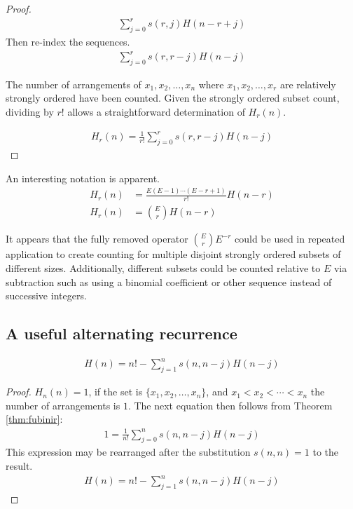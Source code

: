 \documentclass[12pt,reqno]{article}
\begin{document}
\begin{theorem}
\begin{proof}
		\begin{align}
			\sum_{j = 0}^{r} s(r,j) H(n - r + j)
		\end{align}
		Then re-index the sequences.
		\begin{align}
			\sum_{j = 0}^{r} s(r,r - j) H(n - j)
		\end{align}

		The number of arrangements of $x_{1}, x_{2}, \ldots, x_{n}$ where $x_{1}, x_{2}, \ldots, x_{r}$ are relatively strongly ordered have been counted. Given the strongly ordered subset count, dividing by $r!$ allows a straightforward determination of $H_{r}(n)$.

		\begin{align}
			H_{r} (n) = \frac{1}{r!}\sum_{j = 0}^{r} s(r,r - j) H(n - j) \nonumber
		\end{align}

	\end{proof}

\end{theorem}

An interesting notation is apparent.
\begin{align}
	H_{r} (n)  &= \frac{E (E - 1) \cdots (E - r + 1)}{r!} H(n - r) \\
	H_{r} (n)  &= \binom{E}{r} H(n - r) \label{eqn:binomform}
\end{align}

It appears that the fully removed operator $\binom{E}{r} E^{-r}$ could be used in repeated application to create counting for multiple disjoint strongly ordered subsets of different sizes. Additionally, different subsets could be counted relative to $E$ via subtraction such as using a binomial coefficient or other sequence instead of successive integers.

\subsection{A useful alternating recurrence}
\begin{corollary}

	\begin{align}
		H(n) = n!  - \sum_{j = 1}^{n} s(n,n - j) H(n - j)
	\end{align}
	\begin{proof}
		$H_{n}(n) = 1$, if the set is $\{x_{1}, x_{2},\ldots, x_{n}\}$, and $x_{1} < x_{2} < \cdots < x_{n}$ the number of arrangements is $1$. The next equation then follows from Theorem \ref{thm:fubinir}:
		\begin{align}
			1  = \frac{1}{n!}\sum_{j = 0}^{n} s(n,n - j) H(n - j) \label{eqn:matrixpredec}
		\end{align}
		This expression may be rearranged after the substitution $s(n,n) = 1$ to the result.
		\begin{align}
			H(n)  = n! - \sum_{j = 1}^{n} s(n,n - j) H(n - j) \nonumber
		\end{align}
	\end{proof}
\end{corollary}
\end{document}
